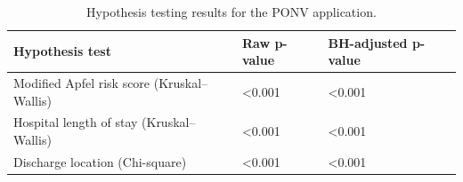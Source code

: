 \begin{table}[!h]
\centering
\caption{\label{tab:tab:ponv_hypothesis_tests}Hypothesis testing results for the PONV application.}
\centering
\begin{tabular}[t]{>{\raggedright\arraybackslash}p{9cm}>{\centering\arraybackslash}p{2.5cm}>{\centering\arraybackslash}p{3cm}}
\toprule
Hypothesis test & Raw p-value & BH-adjusted p-value\\
\midrule
Modified Apfel risk score (Kruskal–Wallis) & <0.001 & <0.001\\
Hospital length of stay (Kruskal–Wallis) & <0.001 & <0.001\\
Discharge location (Chi-square) & <0.001 & <0.001\\
\bottomrule
\end{tabular}
\end{table}
